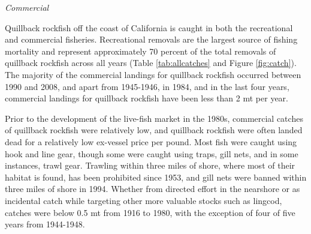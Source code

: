 \documentclass[11pt,
  english,
  letterpaper,
]{article}
\begin{document}
\leavevmode\tagmcend\tagstructend


\emph{Commercial}

\leavevmode\tagmcend\tagstructend\par


Quillback rockfish off the coast of California is caught in both the recreational and commercial fisheries. Recreational removals are the largest source of fishing mortality and represent approximately 70 percent of the total removals of quillback rockfish across all years (Table \ref{tab:allcatches} and Figure \ref{fig:catch}). The majority of the commercial landings for quillback rockfish occurred between 1990 and 2008, and apart from 1945-1946, in 1984, and in the last four years, commercial landings for quillback rockfish have been less than 2 mt per year.

\leavevmode\tagmcend\tagstructend\par


Prior to the development of the live-fish market in the 1980s, commercial catches of quillback rockfish were relatively low, and quillback rockfish were often landed dead for a relatively low ex-vessel price per pound. Most fish were caught using hook and line gear, though some were caught using traps, gill nets, and in some instances, trawl gear. Trawling within three miles of shore, where most of their habitat is found, has been prohibited since 1953, and gill nets were banned within three miles of shore in 1994. Whether from directed effort in the nearshore or as incidental catch while targeting other more valuable stocks such as lingcod, catches were below 0.5 mt from 1916 to 1980, with the exception of four of five years from 1944-1948.

\leavevmode\tagmcend\tagstructend\par

\end{document}
